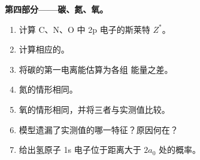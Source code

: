\begin{problem}
\medskip
\noindent\textbf{第四部分——碳、氮、氧。}
\begin{enumerate}[resume]
  \item 计算 C、N、O 中 2p 电子的斯莱特 $Z^*$。
  \item 计算相应的。
  \item 将碳的第一电离能估算为各组
        能量之差。
  \item 氮的情形相同。
  \item 氧的情形相同，并将三者与实测值比较。
  \item 模型遗漏了实测值的哪一特征？原因何在？
  \item 给出氢原子 1s 电子位于距离大于
        $2a_0$ 处的概率。
\end{enumerate}
\end{problem}
